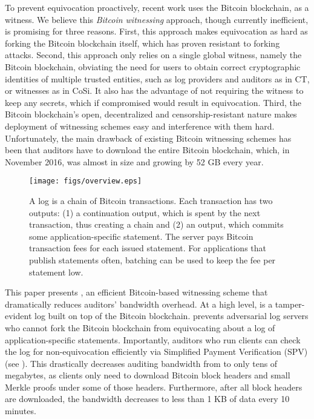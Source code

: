 To prevent equivocation proactively, recent work\cite{keybase,blockstack} uses the Bitcoin blockchain\cite{bitcoin}, as a witness.
We believe this \emph{Bitcoin witnessing} approach, though currently inefficient, is promising for three reasons.
First, this approach makes equivocation as hard as forking the Bitcoin blockchain itself, which has proven resistant to forking attacks.
Second, this approach only relies on a single global witness, namely the Bitcoin blockchain, obviating the need for users to obtain correct cryptographic identities of multiple trusted entities, such as log providers and auditors as in CT\cite{ct}, or witnesses as in CoSi\cite{cosi}.
It also has the advantage of not requiring the witness to keep any secrets, which if compromised would result in equivocation.
Third, the Bitcoin blockchain's open, decentralized and censorship-resistant nature makes deployment of witnessing schemes easy and interference with them hard.
Unfortunately, the main drawback of existing Bitcoin witnessing schemes has been that auditors have to download the entire Bitcoin blockchain, which, in November 2016, was almost \blockchainsize\cite{bitcoin-size} in size and growing by 52 GB every year.

\begin{figure}[t]
  \centering
    \texttt{[image: figs/overview.eps]}
    \vspace{-.5cm}
    \caption{A \Sys log is a chain of Bitcoin transactions. Each \Sys transaction has two outputs: (1) a continuation output, which is spent by the next \Sys transaction, thus creating a chain and (2) an \opret output, which commits some application-specific statement. The server pays Bitcoin transaction fees for each issued statement. For applications that publish statements often, batching can be used to keep the fee per statement low.}
    \label{fig:catena-overview}
\end{figure}

This paper presents \emph{\Sys}, an efficient Bitcoin-based witnessing scheme that dramatically reduces auditors' bandwidth overhead.
At a high level, \Sys is a tamper-evident log\cite{ht} built on top of the Bitcoin blockchain.
\Sys prevents adversarial log servers who cannot fork the Bitcoin blockchain from equivocating about a log of application-specific statements.
Importantly, auditors who run \Sys clients can check the log for non-equivocation efficiently via Simplified Payment Verification (SPV)\cite{bitcoin} (see ). 
This drastically decreases auditing bandwidth from \blockchainsize\cite{bitcoin-size} to only tens of megabytes, as \Sys clients only need to download Bitcoin block headers and small Merkle proofs under some of those headers.
Furthermore, after all block headers are downloaded, the bandwidth decreases to less than 1 KB of data every 10 minutes.


